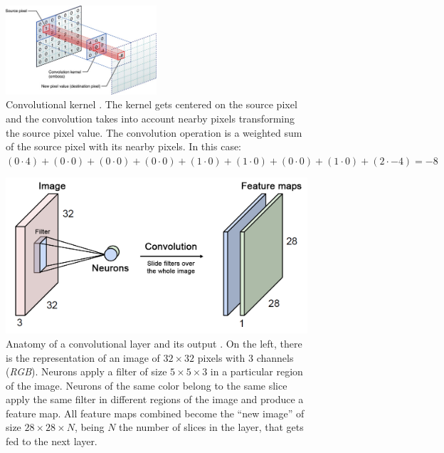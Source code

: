\begin{figure}[htb]
  \begin{center}
    \includegraphics[width=0.5\textwidth]{gfx/kernel}
  \end{center}
  \caption{Convolutional kernel \cite{Apple}.
    The kernel gets centered on the source pixel and the convolution takes into account nearby pixels transforming the source pixel value.
    The convolution operation is a weighted sum of the source pixel with its nearby pixels. In this case:\\
    $(0\cdot4)+(0\cdot0)+(0\cdot0)
     +(0\cdot0)+(1\cdot0)+(1\cdot0)
     +(0\cdot0)+(1\cdot0)+(2\cdot-4) = -8$
  }
  \label{fig:sec:theory:covnets:kernel}
\end{figure}

\begin{figure}[htb]
  \includegraphics[width=\textwidth]{gfx/conv-layer-2}
  \caption{Anatomy of a convolutional layer and its output \cite{Guerzhoy2016}.
    On the left, there is the representation of an image of ${32}\times{32}$ pixels with $3$ channels (\emph{RGB}).
    Neurons apply a filter of size ${5}\times{5}\times{3}$ in a particular region of the image.
    Neurons of the same color belong to the same slice apply the same filter in different regions of the image and produce a feature map.
    All feature maps combined become the ``new image'' of size ${28}\times{28}\times{N}$, being $N$ the number of slices in the layer, that gets fed to the next layer.}
  \label{fig:sec:theory:conv-layer-2}
\end{figure}

